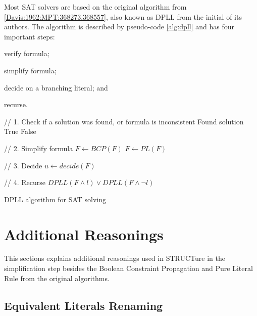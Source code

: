 Most SAT solvers are based on the original algorithm from
\ref{Davis:1962:MPT:368273.368557}, also known as DPLL from the
initial of its authors.  The algorithm is described by pseudo-code
\ref{alg:dpll} and has four important steps:
\begin{inparaenum}[1)]
  \item verify formula;
  \item simplify formula;
  \item decide on a branching literal; and
  \item recurse.
\end{inparaenum}

\begin{algorithm}
  \begin{algorithmic}

    // 1. Check if a solution was found, or formula is inconsistent
      \PRINT Found solution
      \RETURN True
    \ENDIF
      \RETURN False
    \ENDIF

    // 2. Simplify formula
      \STATE $F \gets BCP(F)$
    \ENDFOR
      \STATE $F \gets PL(F)$
    \ENDFOR

    // 3. Decide
    \STATE $u \gets decide(F)$

    // 4. Recurse
    \RETURN $DPLL(F \land l) \lor DPLL(F \land \neg l)$
  \end{algorithmic}

  \caption{DPLL algorithm for SAT solving}
  \label{alg:dpll}
\end{algorithm}


\section{Additional Reasonings}

This sections explains additional reasonings used in STRUCTure in
the simplification step besides the Boolean Constraint Propagation
and Pure Literal Rule from the original algorithms.


\subsection{Equivalent Literals Renaming}
\label{ssec:eqlr}

